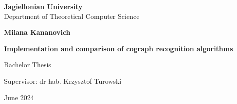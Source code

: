 \begin{titlepage}
	\begin{center}
        
		\large
		\textbf{Jagiellonian University}\\
		Department of Theoretical Computer Science\\

		\vspace{1.5cm}

		\Large
		\textbf{Milana Kananovich}

		\vspace*{2cm}

		\textbf{\LARGE Implementation and comparison of cograph recognition algorithms}
		
		\vspace{0.5cm}
		\large
		
		\vfill
		\Large
		Bachelor Thesis

		\vfill
		\Large
		Supervisor: dr hab. Krzysztof Turowski
		
		\vspace{0.8cm}
		
		  June 2024
		
\end{center}
\end{titlepage}